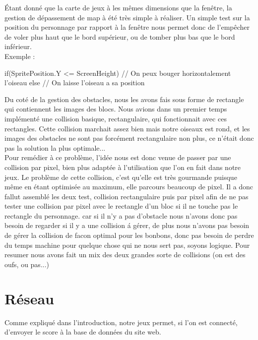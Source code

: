 \documentclass [11pt]{report}
\begin{document}
		\indent Étant donné que la carte de jeux à les mêmes dimensions que la fenêtre, la gestion de dépassement de map à été très simple à réaliser. Un simple test sur la position du personnage par rapport à la fenêtre nous permet donc de l'empêcher de voler plus haut que le bord supérieur, ou de tomber plus bas que le bord inférieur. \\

		
		Exemple :
		
		\begin{mylisting}
		
if(SpritePosition.Y <= ScreenHeight)
{
	// On peux bouger horizontalement l'oiseau
}
else
{
	// On laisse l'oiseau a sa position
}
		\end{mylisting}
	\vspace{10mm}
		
				
		\indent Du coté de la gestion des obstacles, nous les avons fais sous forme de rectangle qui contiennent les images des blocs. Nous avions dans un premier temps implémenté une collision basique, rectangulaire, qui fonctionnait avec ces rectangles. Cette collision marchait assez bien mais notre oiseaux est rond, et les images des obstacles ne sont pas forcément rectangulaire non plus, ce n'était donc pas la solution la plus optimale... \\
		\indent Pour remédier à ce problème, l'idée nous est donc venue de passer par une collision par pixel, bien plus adaptée à l'utilisation que l'on en fait dans notre jeux. Le problème de cette collision, c'est qu'elle est très gourmande puisque même en étant optimisée au maximum, elle parcours beaucoup de pixel. Il a donc fallut assemblé les deux test, collision rectangulaire puis par pixel afin de ne pas tester une collision par pixel avec le rectangle d'un bloc si il ne touche pas le rectangle du personnage. car si il n'y a pas d'obstacle nous n'avons donc pas besoin de regarder si il y a une collision \'a g\'erer, de plus nous n'avons pas besoin de g\'erer la collision de facon optimal pour les bonbons, donc pas besoin de perdre du temps machine pour quelque chose qui ne nous sert pas, soyons logique. Pour resumer nous avons fait un mix des deux grandes sorte de collisions (on est des oufs, ou pas...)
	
	
	\vspace{10mm}
	
	\section{Réseau}
	Comme expliqué dans l'introduction, notre jeux permet, si l'on est connecté, d'envoyer le score à la base de données du site web.\\
	
\end{document}
